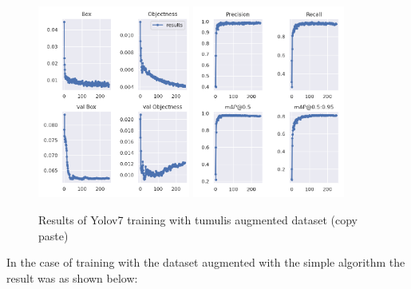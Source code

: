 \begin{figure}[H]
    \centering
    {{\includegraphics[width=5cm]{images/training/mamoas/aug1.png} }}
    \qquad
  {{\includegraphics[width=5cm]{images/training/mamoas/aug2.png} }}
    \caption{Results of Yolov7 training with tumulis augmented dataset (copy paste)}
    \label{fig:example}
\end{figure}

In the case of training with the dataset augmented with the simple algorithm the result was as shown below:

